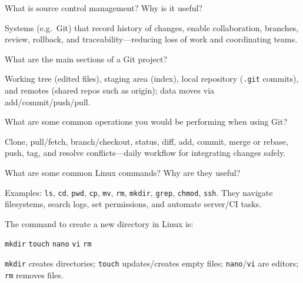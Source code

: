 


\question[4]
What is source control management? Why is it useful?
\begin{solutionorbox}[1.25in]
  Systems (e.g.\ Git) that record history of changes, enable collaboration, branches, review, rollback, and traceability---reducing loss of work and coordinating teams.
\end{solutionorbox}

\question[4]
What are the main sections of a Git project?
\begin{solutionorbox}[1.25in]
  Working tree (edited files), staging area (index), local repository (\texttt{.git} commits), and remotes (shared repos such as origin); data moves via add/commit/push/pull.
\end{solutionorbox}

\question[4]
What are some common operations you would be performing when using Git?
\begin{solutionorbox}[1.45in]
  Clone, pull/fetch, branch/checkout, status, diff, add, commit, merge or rebase, push, tag, and resolve conflicts---daily workflow for integrating changes safely.
\end{solutionorbox}

\newpage

\question[4]
What are some common Linux commands? Why are they useful?
\begin{solutionorbox}[1.45in]
  Examples: \texttt{ls}, \texttt{cd}, \texttt{pwd}, \texttt{cp}, \texttt{mv}, \texttt{rm}, \texttt{mkdir}, \texttt{grep}, \texttt{chmod}, \texttt{ssh}. They navigate filesystems, search logs, set permissions, and automate server/CI tasks.
\end{solutionorbox}

\question[4]
The command to create a new directory in Linux is:
\begin{choices}
  \CorrectChoice \texttt{mkdir}
  \choice \texttt{touch}
  \choice \texttt{nano}
  \choice \texttt{vi}
  \choice \texttt{rm}
\end{choices}
\begin{solution}
  \texttt{mkdir} creates directories; \texttt{touch} updates/creates empty files; \texttt{nano}/\texttt{vi} are editors; \texttt{rm} removes files.
\end{solution}

